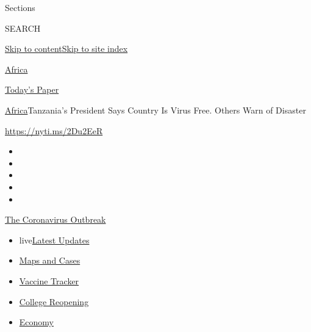 Sections

SEARCH

\protect\hyperlink{site-content}{Skip to
content}\protect\hyperlink{site-index}{Skip to site index}

\href{https://www.nytimes.com/section/world/africa}{Africa}

\href{https://myaccount.nytimes.com/auth/login?response_type=cookie\&client_id=vi}{}

\href{https://www.nytimes.com/section/todayspaper}{Today's Paper}

\href{/section/world/africa}{Africa}\textbar{}Tanzania's President Says
Country Is Virus Free. Others Warn of Disaster

\url{https://nyti.ms/2Du2EeR}

\begin{itemize}
\item
\item
\item
\item
\item
\end{itemize}

\href{https://www.nytimes.com/news-event/coronavirus?action=click\&pgtype=Article\&state=default\&region=TOP_BANNER\&context=storylines_menu}{The
Coronavirus Outbreak}

\begin{itemize}
\tightlist
\item
  live\href{https://www.nytimes.com/2020/08/04/world/coronavirus-cases.html?action=click\&pgtype=Article\&state=default\&region=TOP_BANNER\&context=storylines_menu}{Latest
  Updates}
\item
  \href{https://www.nytimes.com/interactive/2020/us/coronavirus-us-cases.html?action=click\&pgtype=Article\&state=default\&region=TOP_BANNER\&context=storylines_menu}{Maps
  and Cases}
\item
  \href{https://www.nytimes.com/interactive/2020/science/coronavirus-vaccine-tracker.html?action=click\&pgtype=Article\&state=default\&region=TOP_BANNER\&context=storylines_menu}{Vaccine
  Tracker}
\item
  \href{https://www.nytimes.com/2020/08/02/us/covid-college-reopening.html?action=click\&pgtype=Article\&state=default\&region=TOP_BANNER\&context=storylines_menu}{College
  Reopening}
\item
  \href{https://www.nytimes.com/live/2020/08/04/business/stock-market-today-coronavirus?action=click\&pgtype=Article\&state=default\&region=TOP_BANNER\&context=storylines_menu}{Economy}
\end{itemize}

